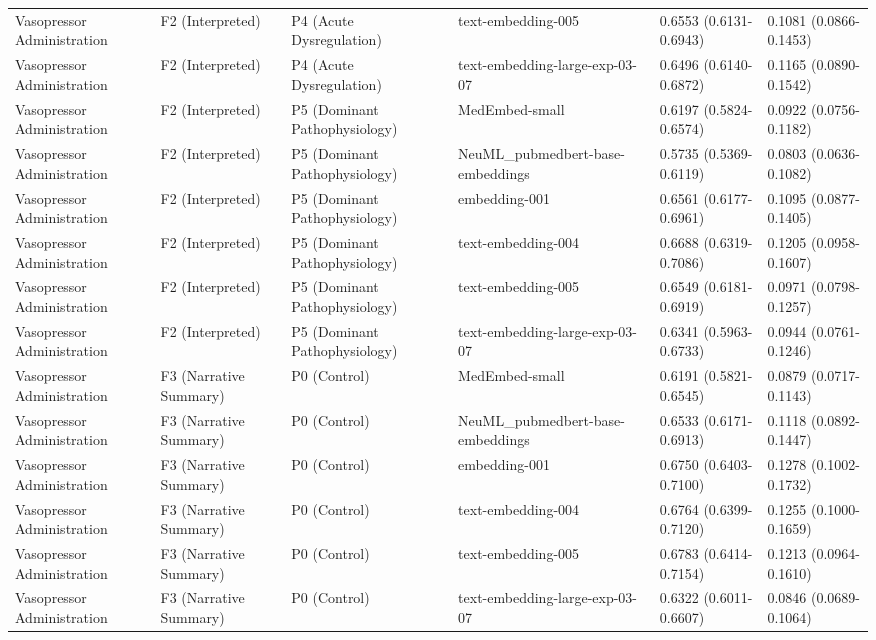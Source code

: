 \documentclass[border=0pt]{standalone}
\begin{document}
\begin{adjustbox}{width=\textwidth}
\begin{tabular}{llllll}
Vasopressor Administration & F2 (Interpreted) & P4 (Acute Dysregulation) & text-embedding-005 & 0.6553 (0.6131-0.6943) & 0.1081 (0.0866-0.1453) \\
Vasopressor Administration & F2 (Interpreted) & P4 (Acute Dysregulation) & text-embedding-large-exp-03-07 & 0.6496 (0.6140-0.6872) & 0.1165 (0.0890-0.1542) \\
Vasopressor Administration & F2 (Interpreted) & P5 (Dominant Pathophysiology) & MedEmbed-small & 0.6197 (0.5824-0.6574) & 0.0922 (0.0756-0.1182) \\
Vasopressor Administration & F2 (Interpreted) & P5 (Dominant Pathophysiology) & NeuML\_pubmedbert-base-embeddings & 0.5735 (0.5369-0.6119) & 0.0803 (0.0636-0.1082) \\
Vasopressor Administration & F2 (Interpreted) & P5 (Dominant Pathophysiology) & embedding-001 & 0.6561 (0.6177-0.6961) & 0.1095 (0.0877-0.1405) \\
Vasopressor Administration & F2 (Interpreted) & P5 (Dominant Pathophysiology) & text-embedding-004 & 0.6688 (0.6319-0.7086) & 0.1205 (0.0958-0.1607) \\
Vasopressor Administration & F2 (Interpreted) & P5 (Dominant Pathophysiology) & text-embedding-005 & 0.6549 (0.6181-0.6919) & 0.0971 (0.0798-0.1257) \\
Vasopressor Administration & F2 (Interpreted) & P5 (Dominant Pathophysiology) & text-embedding-large-exp-03-07 & 0.6341 (0.5963-0.6733) & 0.0944 (0.0761-0.1246) \\
Vasopressor Administration & F3 (Narrative Summary) & P0 (Control) & MedEmbed-small & 0.6191 (0.5821-0.6545) & 0.0879 (0.0717-0.1143) \\
Vasopressor Administration & F3 (Narrative Summary) & P0 (Control) & NeuML\_pubmedbert-base-embeddings & 0.6533 (0.6171-0.6913) & 0.1118 (0.0892-0.1447) \\
Vasopressor Administration & F3 (Narrative Summary) & P0 (Control) & embedding-001 & 0.6750 (0.6403-0.7100) & 0.1278 (0.1002-0.1732) \\
Vasopressor Administration & F3 (Narrative Summary) & P0 (Control) & text-embedding-004 & 0.6764 (0.6399-0.7120) & 0.1255 (0.1000-0.1659) \\
Vasopressor Administration & F3 (Narrative Summary) & P0 (Control) & text-embedding-005 & 0.6783 (0.6414-0.7154) & 0.1213 (0.0964-0.1610) \\
Vasopressor Administration & F3 (Narrative Summary) & P0 (Control) & text-embedding-large-exp-03-07 & 0.6322 (0.6011-0.6607) & 0.0846 (0.0689-0.1064) \\

\end{tabular}
\end{adjustbox}
\end{document}
